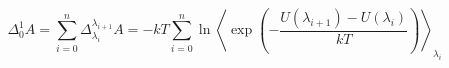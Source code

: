 


\[ \Delta_0^1 A = \sum_{i=0}^n \Delta_{\lambda_i}^{\lambda_{i+1}} A =
- kT \sum_{i=0}^n \ln \left< \exp \left( - \frac{U(\lambda_{i+1}) -
      U(\lambda_i)}{kT} \right) \right>_{\lambda_i} \]


